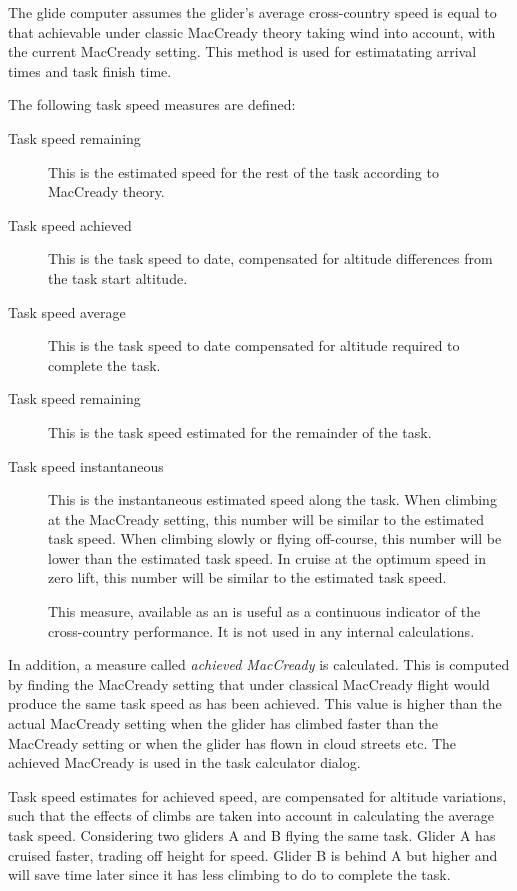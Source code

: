 \documentclass[a4paper,12pt]{refrep}
\begin{document}
The glide computer assumes the glider's average cross-country speed is
equal to that achievable under classic MacCready theory taking wind
into account, with the current MacCready setting.  This method is used
for estimatating arrival times and task finish time.

The following task speed measures are defined:
\begin{description}
\item[Task speed remaining]  This is the estimated speed for the rest of
the task according to MacCready theory.
\item[Task speed achieved]  This is the task speed to date, compensated
for altitude differences from the task start altitude.
\item[Task speed average]  This is the task speed to date compensated
for altitude required to complete the task.
\item[Task speed remaining]  This is the task speed estimated for the
  remainder of the task.
\item[Task speed instantaneous]  This is the instantaneous estimated speed 
along the task.  When climbing at the MacCready setting, this number
will be similar to the estimated task speed.  When climbing slowly or
flying off-course, this number will be lower than the estimated task
speed.  In cruise at the optimum speed in zero lift, this number will
be similar to the estimated task speed.

This measure, available as an {\InfoBox} is useful as a continuous
indicator of the cross-country performance.  It is not used in any
internal calculations.
\end{description}

In addition, a measure called {\em achieved MacCready} is calculated.
This is computed by finding the MacCready setting that under classical
MacCready flight would produce the same task speed as has been
achieved.  This value is higher than the actual MacCready setting when
the glider has climbed faster than the MacCready setting or when the
glider has flown in cloud streets etc.  The achieved MacCready is used
in the task calculator dialog.

Task speed estimates for achieved speed, are compensated for altitude
variations, such that the effects of climbs are taken into account in
calculating the average task speed.  Considering two gliders A and B
flying the same task.  Glider A has cruised faster, trading off height
for speed.  Glider B is behind A but higher and will save time later
since it has less climbing to do to complete the task.
\end{document}
